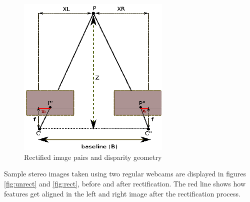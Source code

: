 \begin{figure}[!h]
\centering
\includegraphics[width=0.65\textwidth,trim=22mm 0mm 0mm 150mm,clip]{rectdisp}
\caption{Rectified image pairs and disparity geometry}
\label{fig:rectify}
\end{figure} 

Sample stereo images taken using two regular webcams are displayed in figures \ref{fig:unrect} and \ref{fig:rect},
before and after rectification. 
The red line shows how features get aligned in the left and right image after the rectification process.

